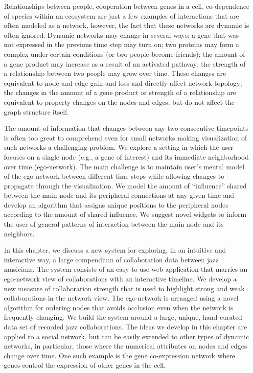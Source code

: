 \documentclass[12pt]{cmuthesis}
\begin{document}
Relationships between people, cooperation between genes in a cell, co-dependence of species within an ecosystem are just a few examples of interactions that are often modeled as a network, however, the fact that these networks are dynamic is often ignored. Dynamic networks may change in several ways: a gene that was not expressed in the previous time step may turn on; two proteins may form a complex under certain conditions (or two people become friends); the amount of a gene product may increase as a result of an activated pathway; the strength of a relationship between two people may grow over time. These changes are equivalent to node and edge gain and loss and directly affect network topology; the changes in the amount of a gene product or strength of a relationship are equivalent to property changes on the nodes and edges, but do not affect the graph structure itself.

The amount of information that changes between any two consecutive timepoints is often too great to comprehend even for small networks making visualization of such networks a challenging problem. We explore a setting in which the user focuses on a single node (e.g., a gene of interest) and its immediate neighborhood over time (ego-network). The main challenge is to maintain user's mental model of the ego-network between different time steps while allowing changes to propagate through the visualization. We model the amount of ``influence'' shared between the main node and its peripheral connections at any given time and develop an algorithm that assigns unique positions to the peripheral nodes according to the amount of shared influence. We suggest novel widgets to inform the user of general patterns of interaction between the main node and its neighbors.

In this chapter, we discuss a new system for exploring, in an intuitive and interactive way, a large compendium of collaboration data between jazz musicians. The system consists of an easy-to-use web application that marries an ego-network view of collaborations with an interactive timeline.  We develop a new measure of collaboration strength that is used to highlight strong and weak collaborations in the network view. The ego-network is arranged using a novel algorithm for ordering nodes that avoids occlusion even when the network is frequently changing. We build the system around a large, unique, hand-curated data set of recorded jazz collaborations. The ideas we develop in this chapter are applied to a social network, but can be easily extended to other types of dynamic networks, in particular, those where the numerical attributes on nodes and edges change over time. One such example is the gene co-expression network where genes control the expression of other genes in the cell.
\end{document}
